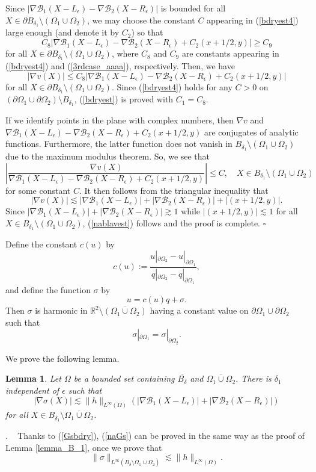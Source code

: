 \documentclass[11pt,a4paper]{article}
\numberwithin{equation}{section}
\newtheorem{lem}[thm]{Lemma}
\newcommand{\qed}{\hfill \ensuremath{\square}}
\newcommand{\pf}{\noindent {\sl Proof}. \ }
\newcommand{\p}{\partial}
\newcommand{\norm}[1]{\| #1 \|}
\newcommand{\eqnref}[1]{(\ref {#1})}
\newcommand{\Rbb}{\mathbb{R}}
\newcommand{\Bcal}{\mathcal{B}}
\newcommand{\Gd}{\delta}
\newcommand{\Ge}{\epsilon}
\newcommand{\Gs}{\sigma}
\newcommand{\GO}{\Omega}
\newcommand{\beq}{\begin{equation}}
\newcommand{\eeq}{\end{equation}}
\newcommand{\ol}{\overline}
\begin{document}
Since $|\nabla \Bcal_1 (X-L_\Ge) - \nabla \Bcal_2 (X - R_\Ge)|$ is bounded for all $X \in \p B_{\Gd_1} \setminus (\GO_1 \cup \GO_2)$, we may choose the constant $C$ appearing in \eqnref{bdryest4} large enough (and denote it by $C_2$) so that
$$
C_8 \left| \nabla \Bcal_1 (X-L_\Ge) - \nabla \Bcal_2 (X - R_\Ge) + C_2 \left(x + 1/2, y\right) \right | \ge C_9
$$
for all $X \in \p B_{\Gd_1} \setminus (\GO_1 \cup \GO_2)$, where $C_8$ and $C_9$ are constants appearing in \eqnref{bdryest4} and \eqnref{3rdcase_aaaa}, respectively. Then, we have
\beq\label{bdryest3}
|\nabla  v (X)| \leq C_8 \left| \nabla \Bcal_1 (X-L_\Ge) - \nabla \Bcal_2 (X - R_\Ge) + C_2 \left(x + 1/2, y\right) \right |
\eeq
for all $X \in \p B_{\Gd_1} \setminus (\GO_1 \cup \GO_2)$. Since \eqnref{bdryest4} holds for any $C>0$ on $(\p\GO_1 \cup \p\GO_2) \setminus B_{\Gd_1}$, \eqnref{bdryest} is proved with $C_1=C_8$.


If we identify points in the plane with complex numbers, then $\nabla v$ and $\nabla \Bcal_1 (X-L_\Ge) - \nabla \Bcal_2 (X - R_\Ge) + C_2 \left(x + 1/2,y\right)$ are conjugates of analytic functions. Furthermore, the latter function does not vanish in $B_{\Gd_1} \setminus (\GO_1 \cup \GO_2)$ due to the maximum modulus theorem. So, we see that
$$
\left|\frac {\nabla  v (X) } {\nabla \Bcal_1 ( X - L_\Ge) - \nabla \Bcal_2 ( X - R_\Ge ) + C_2 \left(x+1/2,y\right)}\right| \leq C, \quad X \in B_{\Gd_1} \setminus (\GO_1 \cup \GO_2)
$$
for some constant $C$. It then follows from the triangular inequality that
$$
|\nabla  v (X)| \lesssim |\nabla \Bcal_1 ( X - L_\Ge)| + |\nabla \Bcal_2 ( X - R_\Ge )| + \left| \left( x+1/2,y \right) \right|.
$$
Since $|\nabla \Bcal_1 ( X - L_\Ge)| + |\nabla \Bcal_2 ( X - R_\Ge )| \gtrsim 1$ while $|(x+1/2,y)| \lesssim 1$ for all $X \in B_{\Gd_1} \setminus (\GO_1 \cup \GO_2)$, \eqnref{nablavest} follows and the proof is complete. \qed

\medskip

Define the constant $c(u)$ by
\beq\label{bdef}
c(u):= \frac {u |_{\p\GO_2} - u |_{\p\GO_1}}{q |_{\p\GO_2} - q|_{\p\GO_1}},
\eeq
and define the function $\Gs$ by
\beq\label{decomp_u=bq+r}
u = c(u) q + \Gs.
\eeq
Then $\Gs$ is harmonic in $\Rbb^2 \setminus \overline {(\GO_{1} \cup \GO_{2})}$ having a constant value on $\p\GO_1 \cup \p \GO_2$ such that
\beq\label{Gsbdry}
\Gs |_{\p \GO_1} = \Gs|_{\p \GO_2} .
\eeq

We prove the following lemma.

\begin{lem}\label{lemma_B}
Let $\GO$ be a bounded set containing $\ol{B_{\Gd}}$ and $\overline{\GO_1 \cup \GO_2}$. There is $\Gd_1$ independent of $\Ge$ such that
\beq\label{naGs}
| \nabla \Gs (X) | \lesssim \| h \|_{L^{\infty}(\GO)} \left(\left| \nabla \Bcal_1\left ( X-L_\Ge \right)\right | + \left| \nabla \Bcal_2\left ( X-R_\Ge \right) \right |\right)
\eeq
for all $X \in  B_{\Gd_1} \setminus \overline {\GO_1 \cup \GO_2}$.
\end{lem}
\pf
Thanks to \eqnref{Gsbdry}, \eqnref{naGs} can be proved in the same way as the proof of Lemma \ref{lemma_B_1}, once we prove that
\beq\label{normGs}
\norm{\Gs}_{L^{\infty} (B_{\Gd} \setminus \overline{\GO_1 \cup \GO_2})} \lesssim \| h \|_{L^{\infty}(\GO)} .
\eeq
\end{document}
